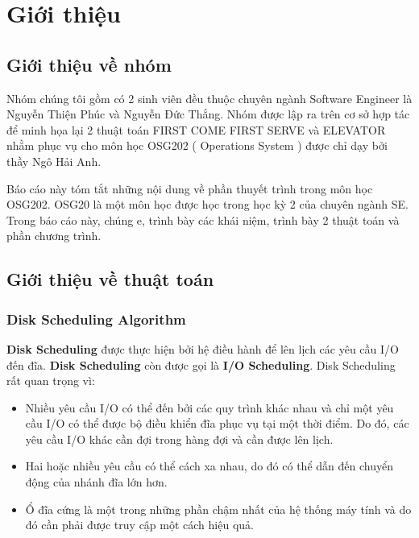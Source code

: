\documentclass{report}
\begin{document}
\tableofcontents{}

\chapter{Giới thiệu}
    \section{Giới thiệu về nhóm}

    Nhóm chúng tôi gồm có 2 sinh viên đều thuộc chuyên ngành Software Engineer là Nguyễn Thiện Phúc và Nguyễn Đức Thắng. Nhóm được lập ra trên cơ sở hợp tác để minh họa lại 2 thuật toán FIRST COME FIRST SERVE và ELEVATOR nhằm phục vụ cho môn học OSG202 ( Operations System ) được chỉ dạy bởi thầy Ngô Hải Anh.
    
    Báo cáo này tóm tắt những nội dung về phần thuyết trình trong môn học OSG202. OSG20 là một môn học được học trong học kỳ 2 của chuyên ngành SE. Trong báo cáo này, chúng e, trình bày các khái niệm, trình bày 2 thuật toán và phần chương trình.

    \section{Giới thiệu về thuật toán}
    \subsection{Disk Scheduling Algorithm}

    \textbf{Disk Scheduling} được thực hiện bởi hệ điều hành để lên lịch các yêu cầu I/O đến đĩa. \textbf{Disk Scheduling} còn được gọi là \textbf{I/O Scheduling}. Disk Scheduling rất quan trọng vì:

    \begin{itemize}
        \item Nhiều yêu cầu I/O có thể đến bởi các quy trình khác nhau và chỉ một yêu cầu I/O có thể được bộ điều khiển đĩa phục vụ tại một thời điểm. Do đó, các yêu cầu I/O khác cần đợi trong hàng đợi và cần được lên lịch.
        
        \item Hai hoặc nhiều yêu cầu có thể cách xa nhau, do đó có thể dẫn đến chuyển động của nhánh đĩa lớn hơn. 
        
        \item Ổ đĩa cứng là một trong những phần chậm nhất của hệ thống máy tính và do đó cần phải được truy cập một cách hiệu quả.
    \end{itemize} 
    
\end{document}
